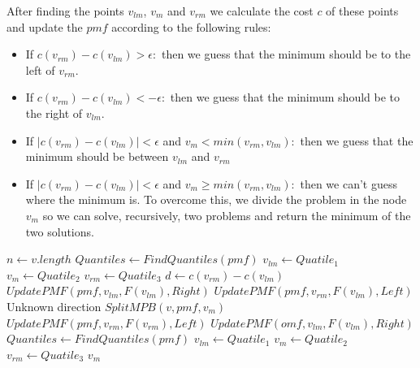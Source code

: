 \documentclass[12pt]{article}
\begin{document}
After finding the points $v_{lm}$, $v_m$ and $v_{rm}$ we calculate the cost $c$ of these points and update the $pmf$ according to the following rules:
\begin{itemize}
    \item{If $c (v_{rm}) - c (v_{lm}) > \epsilon:$} then we guess that the minimum should be to the left of $v_{rm}$.
    \item{If $c (v_{rm}) - c (v_{lm}) < -\epsilon:$} then we guess that the minimum should be to the right of $v_{lm}$.
    \item{If $|c (v_{rm}) - c (v_{lm})| < \epsilon$ and $v_m < {min (v_{rm}, v_{lm})}:$} then we guess that the minimum should be between $v_{lm}$ and $v_{rm}$
    \item{If $|c (v_{rm}) - c (v_{lm})| < \epsilon$ and $v_m \geq {min (v_{rm}, v_{lm})}:$} then we can't guess where the minimum is. To overcome this, we divide the problem in the node $v_m$ so we can solve, recursively, two problems and return the minimum of the two solutions.
\end{itemize}

\begin{algorithm}[h]
\caption{}
\begin{algorithmic}[1]
    \State $n \gets v.length$
    \State $Quantiles \gets FindQuantiles (pmf)$
    \State $v_{lm} \gets Quatile_1$
    \State $v_{m} \gets Quatile_2$
    \State $v_{rm} \gets Quatile_3$
        \State $d \gets c (v_{rm}) - c (v_{lm})$
                \State $UpdatePMF (pmf, v_{lm}, F (v_{lm}), Right)$
                \State $UpdatePMF (pmf, v_{rm}, F (v_{lm}), Left)$
             \Else \Comment Unknown direction
                \State
                \Return $SplitMPB (v, pmf, v_m)$
            \EndIf
                \State $UpdatePMF (pmf, v_{rm}, F (v_{rm}), Left)$
            \Else
                \State $UpdatePMF (omf, v_{lm}, F (v_{lm}), Right)$
        \EndIf
        \State $Quantiles \gets FindQuantiles (pmf)$
        \State $v_{lm} \gets Quatile_1$
        \State $v_{m} \gets Quatile_2$
        \State $v_{rm} \gets Quatile_3$
    \EndWhile
    \State
    \Return $v_m$
\EndProcedure
\end{algorithmic}
\end{algorithm}
\end{document}
